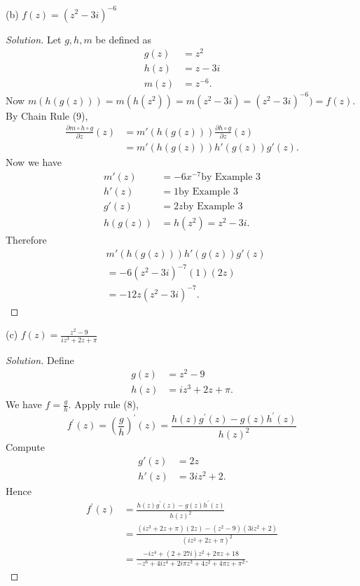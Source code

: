 \begin{enumerate}
(b) $f(z)=\left(z^2-3 i\right)^{-6}$
\begin{proof}[Solution]
	Let $g,h,m$ be defined as 
	\begin{align*}
		g(z)&= z^2 \\
		h(z)&= z-3i \\
		m(z)&= z^{-6}
	.\end{align*}
	Now $m(h(g(z))) = m(h(z^2)) = m(z^2-3i) = (z^2-3i)^{-6}) = f(z)$.
	By Chain Rule (9),
	\begin{align*}
		\frac{\partial m \circ h \circ g}{\partial z}(z) &= m' (h(g(z))) \frac{\partial h \circ g}{\partial z} (z) \\ 
		 &= m' (h(g(z))) h' (g(z)) g' (z)
	.\end{align*}
	Now we have
	\begin{align*}
		m' (z) &= -6 x^{-7}  \text{by Example 3}\\
		h' (z) &= 1 \text{by Example 3} \\
		g' (z) &= 2z \text{by Example 3}  \\
		h(g(z)) &= h(z^2) = z^2 -3i
	.\end{align*}
	Therefore
	\begin{align*}
		&m' (h(g(z))) h' (g(z)) g' (z)\\
		&=  -6(z^2-3i)^{-7} (1) (2z)\\
		&=  -12z(z^2-3i)^{-7}
	.\end{align*}
\end{proof}

(c) $f(z)=\frac{z^2-9}{i z^3+2 z+\pi}$
\begin{proof}[Solution]
	Define 
	\begin{align*}
		g(z)&= z^2 - 9 \\
		h(z)&=  i z^3+2 z+\pi
	.\end{align*}
	We have $f = \frac{g}{h}$. Apply rule (8),
	\[
		f^\prime(z) = \left(\frac{g}{h}\right)^{\prime}(z)=\frac{h(z) g^{\prime}(z)-g(z) h^{\prime}(z)}{h(z)^2}
	\]
	Compute
	\begin{align*}
		g'(z) &= 2z \\
		h'(z) &= 3 i z^2 + 2
	.\end{align*}
	Hence
\begin{align*}
	f^\prime(z) &= \frac{h(z) g^{\prime}(z)-g(z) h^{\prime}(z)}{h(z)^2}\\
		 &= \frac{(i z^3+2 z+\pi) (2z)-(z^2-9) \left( 3 i z^2 + 2 \right) }{\left( i z^3+2 z+\pi \right) ^2}\\
		 &= \frac{-i z^4+(2+27 i) z^2+2 \pi z+18}{-z^6+4 i z^4+2 i \pi z^3+4 z^2+4 \pi z+\pi^2}
.\end{align*}
\end{proof}


\end{enumerate}
